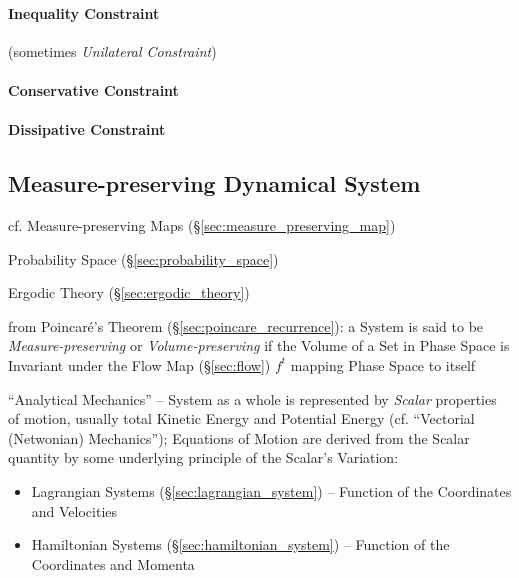 \paragraph{Inequality Constraint}\label{sec:inequality_constraint}\hfill

(sometimes \emph{Unilateral Constraint})



\paragraph{Conservative Constraint}\label{sec:conservative_constraint}\hfill

\paragraph{Dissipative Constraint}\label{sec:dissipative_constraint}\hfill



\subsection{Measure-preserving Dynamical System}
\label{sec:measure_preserving_system}

\fist cf. Measure-preserving Maps (\S\ref{sec:measure_preserving_map})

Probability Space (\S\ref{sec:probability_space})

\fist Ergodic Theory (\S\ref{sec:ergodic_theory})

from Poincar\'e's Theorem (\S\ref{sec:poincare_recurrence}): a System is said to
be \emph{Measure-preserving} or \emph{Volume-preserving} if the Volume of a Set
in Phase Space is Invariant under the Flow Map (\S\ref{sec:flow}) $f^t$ mapping
Phase Space to itself

``Analytical Mechanics'' -- System as a whole is represented by \emph{Scalar}
properties of motion, usually total Kinetic Energy and Potential Energy (cf.
``Vectorial (Netwonian) Mechanics''); Equations of Motion are derived from the
Scalar quantity by some underlying principle of the Scalar's Variation:
\begin{itemize}
  \item Lagrangian Systems (\S\ref{sec:lagrangian_system}) -- Function of the
    Coordinates and Velocities
  \item Hamiltonian Systems (\S\ref{sec:hamiltonian_system}) -- Function of the
    Coordinates and Momenta
\end{itemize}



